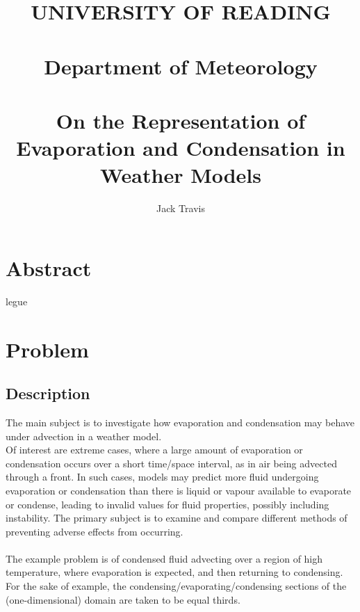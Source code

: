 \documentclass[11pt]{article}
\begin{document}
\thispagestyle{empty}
\title{UNIVERSITY OF READING\\
~\\
Department of Meteorology\\
~\\
On the Representation of Evaporation and Condensation in Weather Models}
\author{Jack Travis}
\maketitle


\section{Abstract}
legue

\newpage

\tableofcontents

\newpage

\section{Problem}
\subsection{Description}
The main subject is to investigate how evaporation and condensation may behave under advection in a weather model. \\
Of interest are extreme cases, where a large amount of evaporation or condensation occurs over a short time/space interval, as in air being advected through a front. In such cases, models may predict more fluid undergoing evaporation or condensation than there is liquid or vapour available to evaporate or condense, leading to invalid values for fluid properties, possibly including instability. The primary subject is to examine and compare different methods of preventing adverse effects from occurring.\\
~\\
The example problem is of condensed fluid advecting over a region of high temperature, where evaporation is expected, and then returning to condensing. For the sake of example, the condensing/evaporating/condensing sections of the (one-dimensional) domain are taken to be equal thirds.
\end{document}
